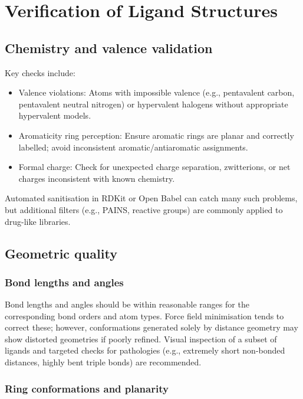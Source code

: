 \documentclass[12pt]{article}
\begin{document}
\section{Verification of Ligand Structures}

\subsection{Chemistry and valence validation}

Key checks include:
\begin{itemize}
  \item Valence violations: Atoms with impossible valence (e.g., pentavalent carbon, pentavalent neutral nitrogen) or hypervalent halogens without appropriate hypervalent models.
  \item Aromaticity ring perception: Ensure aromatic rings are planar and correctly labelled; avoid inconsistent aromatic/antiaromatic assignments.
  \item Formal charge: Check for unexpected charge separation, zwitterions, or net charges inconsistent with known chemistry.
\end{itemize}

Automated sanitisation in RDKit or Open Babel can catch many such problems, but additional filters (e.g., PAINS, reactive groups) are commonly applied to drug-like libraries.

\subsection{Geometric quality}

\subsubsection{Bond lengths and angles}

Bond lengths and angles should be within reasonable ranges for the corresponding bond orders and atom types. Force field minimisation tends to correct these; however, conformations generated solely by distance geometry may show distorted geometries if poorly refined. Visual inspection of a subset of ligands and targeted checks for pathologies (e.g., extremely short non-bonded distances, highly bent triple bonds) are recommended.

\subsubsection{Ring conformations and planarity}
\end{document}
